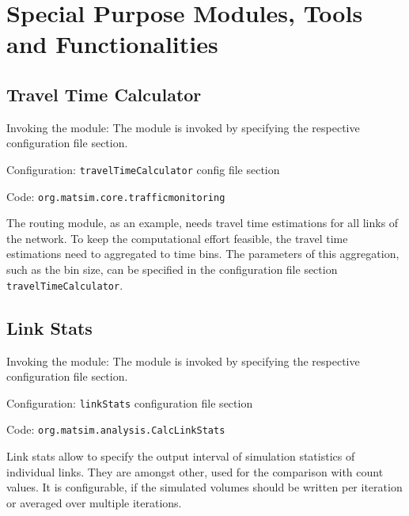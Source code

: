 \section{Special Purpose Modules, Tools and Functionalities}
\label{sec:specialpurpose}

\subsection{Travel Time Calculator}
\label{sec:ttc}
\begin{compactitem}
\item Invoking the module: The module is invoked by specifying the respective configuration file section.
\item Configuration: \lstinline|travelTimeCalculator| config file section
\item Code: \lstinline|org.matsim.core.trafficmonitoring|
\end{compactitem}

The routing module, as an example, needs travel time estimations for all links of the network. To keep the computational effort feasible, the travel time estimations need to aggregated to time bins. The parameters of this aggregation, such as the bin size, can be specified in the configuration file section \lstinline|travelTimeCalculator|.

\subsection{Link Stats}
\label{sec:linkStats}
\begin{compactitem}
\item Invoking the module: The module is invoked by specifying the respective configuration file section.
\item Configuration: \lstinline|linkStats| configuration file section
\item Code: \lstinline|org.matsim.analysis.CalcLinkStats|
\end{compactitem}

Link stats allow to specify the output interval of simulation statistics of individual links. They are amongst other, used for the comparison with count values. It is configurable, if the simulated volumes should be written per iteration or averaged over multiple iterations.

